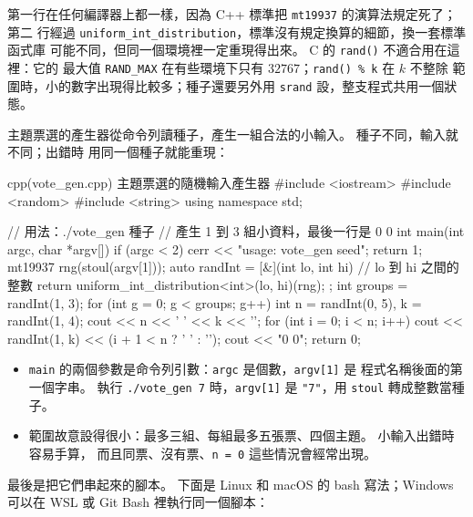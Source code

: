第一行在任何編譯器上都一樣，因為 C++ 標準把 \texttt{mt19937} 的演算法規定死了；第二
行經過 \texttt{uniform\_int\_distribution}，標準沒有規定換算的細節，換一套標準函式庫
可能不同，但同一個環境裡一定重現得出來。 C 的 \texttt{rand()} 不適合用在這裡：它的
最大值 \texttt{RAND\_MAX} 在有些環境下只有 $32767$；\texttt{rand() \% k} 在 $k$ 不整除
範圍時，小的數字出現得比較多；種子還要另外用 \texttt{srand} 設，整支程式共用一個狀
態。

主題票選的產生器從命令列讀種子，產生一組合法的小輸入。 種子不同，輸入就不同；出錯時
用同一個種子就能重現：

\begin{example}[label=ex:vote-gen]{cpp}{(vote\_gen.cpp) 主題票選的隨機輸入產生器}
#include <iostream>
#include <random>
#include <string>
using namespace std;

// 用法：./vote_gen 種子
// 產生 1 到 3 組小資料，最後一行是 0 0
int main(int argc, char *argv[]) {
    if (argc < 2) {
        cerr << "usage: vote_gen seed\n";
        return 1;
    }
    mt19937 rng(stoul(argv[1]));
    auto randInt = [&](int lo, int hi) {   // lo 到 hi 之間的整數
        return uniform_int_distribution<int>(lo, hi)(rng);
    };
    int groups = randInt(1, 3);
    for (int g = 0; g < groups; g++) {
        int n = randInt(0, 5), k = randInt(1, 4);
        cout << n << ' ' << k << '\n';
        for (int i = 0; i < n; i++) {
            cout << randInt(1, k) << (i + 1 < n ? ' ' : '\n');
        }
    }
    cout << "0 0\n";
    return 0;
}
\end{example}

\begin{itemize}
\item \texttt{main} 的兩個參數是命令列引數：\texttt{argc} 是個數，\texttt{argv[1]} 是
程式名稱後面的第一個字串。 執行 \texttt{./vote\_gen 7} 時，\texttt{argv[1]} 是
\texttt{"7"}，用 \texttt{stoul} 轉成整數當種子。
\item 範圍故意設得很小：最多三組、每組最多五張票、四個主題。 小輸入出錯時容易手算，
而且同票、沒有票、\texttt{n = 0} 這些情況會經常出現。
\end{itemize}

最後是把它們串起來的腳本。 下面是 Linux 和 macOS 的 bash 寫法；Windows 可以在 WSL
或 Git Bash 裡執行同一個腳本：


